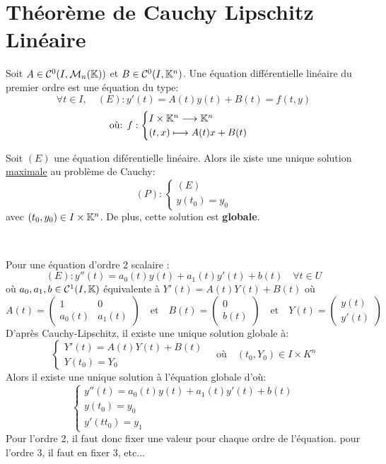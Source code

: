 \section{Théorème de Cauchy Lipschitz Linéaire} 

\begin{definition}
	Soit $A \in \mathcal{C}^0(I, \mathcal{M}_n(\mathbb{K}))$ et $ B \in \mathcal{C}^0(I,\mathbb{K}^n)$. 
	Une équation différentielle linéaire du premier ordre est une équation du type: 
		\[ \boxed{  \forall t \in I, \quad (E) : y'(t) = A(t)y(t) + B(t) = f(t,y)  } \]
		\[ \text{où: } f : 
			\begin{cases} 
				I \times \mathbb{K}^n \longrightarrow \mathbb{K}^n \\ 
				(t,x) \longmapsto A(t)x + B(t) 
			\end{cases} \]
\end{definition} 

\begin{theorem}
	Soit $(E)$ une équation diférentielle linéaire. Alors ile xiste une unique solution 
	\underline{maximale} au problème de Cauchy: 
		\[ (P) : 
			\begin{cases} 
				(E) \\ 
				y(t_0) = y_0 
			\end{cases} \] 
	avec $(t_0, y_0) \in I \times \mathbb{K}^n$. 
	De plus, cette solution est \textbf{globale}. 
\end{theorem} 


\begin{remark} 
	Pour une équation d'ordre 2 scalaire :
		\[ (E) : y''(t) = a_0(t)y(t) + a_1(t)y'(t) + b(t) \quad \forall t \in U \] 
	où $a_0, a_1,b \in \mathcal{C}^1(I, \mathbb{K})$ équivalente à $ Y'(t) = A(t) Y(t) + B(t) $ où 
		\[ A(t) =  
			\begin{pmatrix}
				1 & 0 \\ 
				a_0(t) & a_1(t) 
			\end{pmatrix} 
			\quad \text{et} \quad B(t) = 
			\begin{pmatrix}
				0 \\ 
				b(t) 
			\end{pmatrix}
			\quad \text{et} \quad Y(t) = 
			\begin{pmatrix} 
				y(t)  \\
				y'(t) 
			\end{pmatrix} \]
	D'après Cauchy-Lipschitz, il existe une unique solution globale à: 
		\[ 
			\begin{cases} 
				Y'(t) = A(t) Y(t) + B(t) \\ 
				Y(t_0) = Y_0
			\end{cases} 
			\quad \text{où} \quad (t_0, Y_0) \in I \times K^n 
		\]
	Alors il existe une unique solution à l'équation globale d'où: 
		\[ \begin{cases} 
				y''(t) = a_0(t) y(t) + a_1(t) y'(t) + b(t) \\ 
				y(t_0) = y_0 \\ 
				y'(tt_0) = y_1 
			\end{cases} \] 
	Pour l'ordre 2, il faut donc fixer une valeur pour chaque ordre de l'équation. 
	pour l'ordre 3, il faut en fixer 3, etc...
\end{remark}

